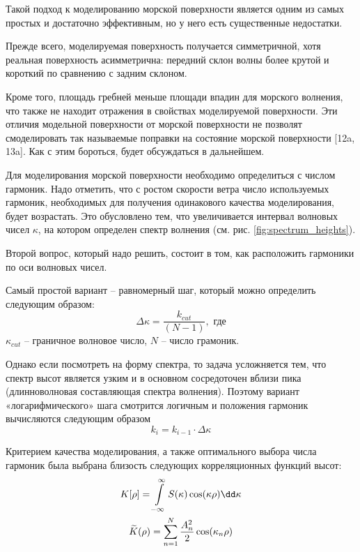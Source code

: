 Такой подход к моделированию морской поверхности является одним из самых простых и достаточно эффективным, но у него есть существенные недостатки.

Прежде всего, моделируемая поверхность получается симметричной, хотя реальная поверхность асимметрична: передний склон волны более крутой и короткий по сравнению с задним склоном.

Кроме того, площадь гребней меньше площади впадин для морского волнения, что также не находит отражения в свойствах моделируемой поверхности. Эти отличия 
модельной поверхности от морской поверхности не позволят смоделировать так называемые поправки на состояние морской поверхности [12a, 13a]. Как с этим бороться, будет обсуждаться в дальнейшем.

Для моделирования морской поверхности необходимо определиться с числом
гармоник. Надо отметить, что с ростом скорости ветра число используемых
гармоник, необходимых для получения одинакового качества моделирования, будет
возрастать. Это обусловлено тем, что увеличивается интервал волновых чисел
$\kappa$, на котором определен спектр волнения (см. рис.
\ref{fig:spectrum_heights}). 

Второй вопрос, который надо решить, состоит в том, как расположить гармоники по оси волновых чисел. 


Самый простой вариант – равномерный шаг, который можно определить следующим образом:
\begin{equation}
    \Delta \kappa = \frac{k_{cut}}{(N-1)}, \text{ где}
\end{equation}
$\kappa_{cut}$ -- граничное волновое число, $N$ -- число грамоник.

Однако если посмотреть на форму спектра, то задача усложняется тем, что спектр высот является узким и в основном сосредоточен вблизи пика (длинноволновая составляющая спектра волнения). Поэтому вариант «логарифмического» шага смотрится логичным и положения гармоник вычисляются следующим образом
\begin{equation}
    k_i = k_{i-1} \cdot \Delta  \kappa
\end{equation}

Критерием качества моделирования, а также оптимального выбора числа гармоник
была выбрана близость следующих корреляционных функций высот:
\begin{equation}
    \begin{gathered}
        \label{eq:KK}
        K[\rho] = \int\limits_{-\infty}^{\infty} S(\kappa) \cos(\kappa\rho) \dd \kappa\\
        \tK(\rho) = \sum\limits_{n=1}^{N} \frac{A_n^2}{2} \cos(\kappa_n \rho)
    \end{gathered}
\end{equation}



